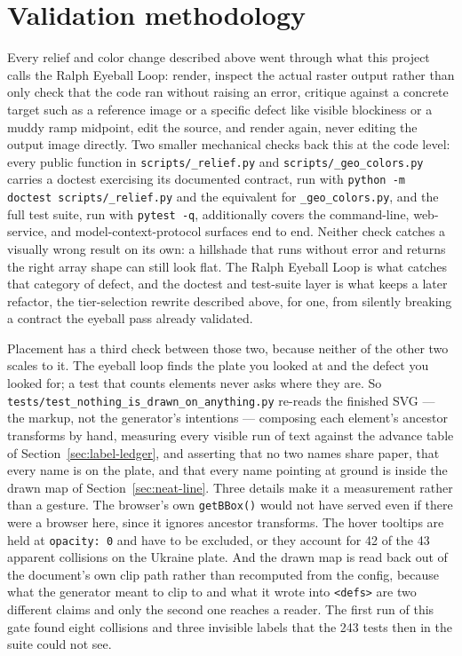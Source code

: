 \documentclass[11pt]{article}
\begin{document}
\section{Validation methodology}
\label{sec:validation}

Every relief and color change described above went through what this
project calls the Ralph Eyeball Loop: render, inspect the actual raster
output rather than only check that the code ran without raising an
error, critique against a concrete target such as a reference image or
a specific defect like visible blockiness or a muddy ramp midpoint,
edit the source, and render again, never editing the output image
directly. Two smaller mechanical checks back this at the code level:
every public function in \texttt{scripts/\_relief.py} and
\texttt{scripts/\_geo\_colors.py} carries a doctest exercising its
documented contract, run with \texttt{python -m doctest scripts/\_relief.py}
and the equivalent for \texttt{\_geo\_colors.py}, and the full test suite,
run with \texttt{pytest -q}, additionally covers the command-line,
web-service, and model-context-protocol surfaces end to end. Neither
check catches a visually wrong result on its own: a hillshade that runs
without error and returns the right array shape can still look flat.
The Ralph Eyeball Loop is what catches that category of defect, and the
doctest and test-suite layer is what keeps a later refactor, the
tier-selection rewrite described above, for one, from silently breaking
a contract the eyeball pass already validated.

Placement has a third check between those two, because neither of the
other two scales to it. The eyeball loop finds the plate you looked at
and the defect you looked for; a test that counts elements never asks
where they are. So \texttt{tests/test\_nothing\_is\_drawn\_on\_anything.py}
re-reads the finished SVG --- the markup, not the generator's intentions
--- composing each element's ancestor transforms by hand, measuring every
visible run of text against the advance table of
Section~\ref{sec:label-ledger}, and asserting that no two names share
paper, that every name is on the plate, and that every name pointing at
ground is inside the drawn map of Section~\ref{sec:neat-line}. Three
details make it a measurement rather than a gesture. The browser's own
\texttt{getBBox()} would not have served even if there were a browser
here, since it ignores ancestor transforms. The hover tooltips are held
at \texttt{opacity: 0} and have to be excluded, or they account for 42 of
the 43 apparent collisions on the Ukraine plate. And the drawn map is
read back out of the document's own clip path rather than recomputed from
the config, because what the generator meant to clip to and what it wrote
into \texttt{<defs>} are two different claims and only the second one
reaches a reader. The first run of this gate found eight collisions and
three invisible labels that the 243 tests then in the suite could not
see.
\end{document}

